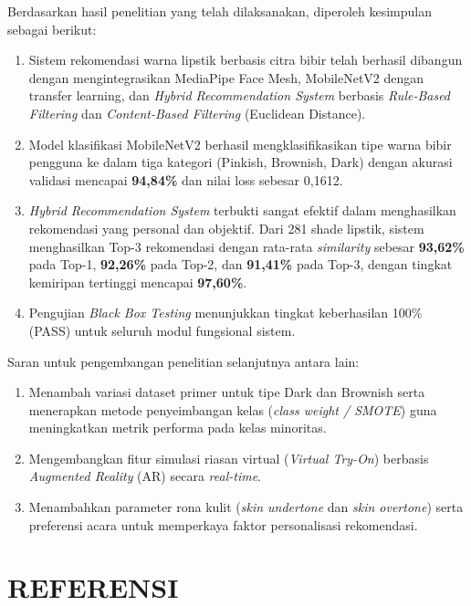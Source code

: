\documentclass[10pt,a4paper]{article}
\begin{document}
Berdasarkan hasil penelitian yang telah dilaksanakan, diperoleh kesimpulan sebagai berikut:
\begin{enumerate}
 \item Sistem rekomendasi warna lipstik berbasis citra bibir telah berhasil dibangun dengan mengintegrasikan MediaPipe Face Mesh, MobileNetV2 dengan transfer learning, dan \textit{Hybrid Recommendation System} berbasis \textit{Rule-Based Filtering} dan \textit{Content-Based Filtering} (Euclidean Distance).
 \item Model klasifikasi MobileNetV2 berhasil mengklasifikasikan tipe warna bibir pengguna ke dalam tiga kategori (Pinkish, Brownish, Dark) dengan akurasi validasi mencapai \textbf{94,84\%} dan nilai loss sebesar 0,1612.
 \item \textit{Hybrid Recommendation System} terbukti sangat efektif dalam menghasilkan rekomendasi yang personal dan objektif. Dari 281 shade lipstik, sistem menghasilkan Top-3 rekomendasi dengan rata-rata \textit{similarity} sebesar \textbf{93,62\%} pada Top-1, \textbf{92,26\%} pada Top-2, dan \textbf{91,41\%} pada Top-3, dengan tingkat kemiripan tertinggi mencapai \textbf{97,60\%}.
 \item Pengujian \textit{Black Box Testing} menunjukkan tingkat keberhasilan 100\% (PASS) untuk seluruh modul fungsional sistem.
\end{enumerate}

Saran untuk pengembangan penelitian selanjutnya antara lain:
\begin{enumerate}
 \item Menambah variasi dataset primer untuk tipe Dark dan Brownish serta menerapkan metode penyeimbangan kelas (\textit{class weight / SMOTE}) guna meningkatkan metrik performa pada kelas minoritas.
 \item Mengembangkan fitur simulasi riasan virtual (\textit{Virtual Try-On}) berbasis \textit{Augmented Reality} (AR) secara \textit{real-time}.
 \item Menambahkan parameter rona kulit (\textit{skin undertone} dan \textit{skin overtone}) serta preferensi acara untuk memperkaya faktor personalisasi rekomendasi.
\end{enumerate}

\section*{REFERENSI }
\end{document}
